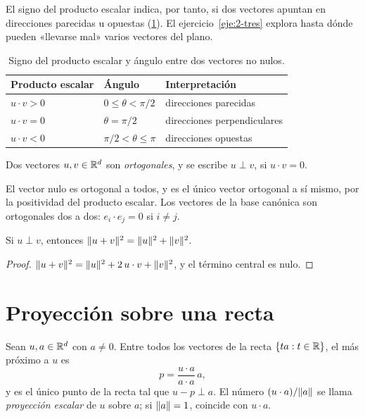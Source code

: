 El signo del producto escalar indica, por tanto, si dos vectores apuntan en direcciones parecidas u opuestas (\cref{tab:signo}). El ejercicio~\ref{eje:2-tres} explora hasta dónde pueden «llevarse mal» varios vectores del plano.

\begin{table}[h]
\centering\small
\caption{Signo del producto escalar y ángulo entre dos vectores no nulos.}\label{tab:signo}
\begin{tabular}{@{}lll@{}}
\toprule
Producto escalar & Ángulo & Interpretación \\
\midrule
$u\cdot v>0$ & $0\le\theta<\pi/2$ & direcciones parecidas \\
$u\cdot v=0$ & $\theta=\pi/2$ & direcciones perpendiculares \\
$u\cdot v<0$ & $\pi/2<\theta\le\pi$ & direcciones opuestas \\
\bottomrule
\end{tabular}
\end{table}

\begin{definicion}[Ortogonalidad]
Dos vectores $u,v\in\mathbb{R}^{d}$ son \emph{ortogonales}, y se escribe $u\perp v$, si $u\cdot v=0$.
\end{definicion}

El vector nulo es ortogonal a todos, y es el único vector ortogonal a sí mismo, por la positividad del producto escalar. Los vectores de la base canónica son ortogonales dos a dos: $e_i\cdot e_j=0$ si $i\neq j$.

\begin{teorema}[Pitágoras]\label{teo:pitagoras}
Si $u\perp v$, entonces $\lVert u+v\rVert^{2}=\lVert u\rVert^{2}+\lVert v\rVert^{2}$.
\end{teorema}

\begin{proof}
$\lVert u+v\rVert^{2}=\lVert u\rVert^{2}+2\,u\cdot v+\lVert v\rVert^{2}$, y el término central es nulo.
\end{proof}

\section{Proyección sobre una recta}

\begin{proposicion}\label{prop:proyeccion}
Sean $u,a\in\mathbb{R}^{d}$ con $a\neq 0$. Entre todos los vectores de la recta $\{ta: t\in\mathbb{R}\}$, el más próximo a $u$ es
\[
p=\frac{u\cdot a}{a\cdot a}\,a,
\]
y es el único punto de la recta tal que $u-p\perp a$. El número $(u\cdot a)/\lVert a\rVert$ se llama \emph{proyección escalar} de $u$ sobre $a$; si $\lVert a\rVert=1$, coincide con $u\cdot a$.
\end{proposicion}

